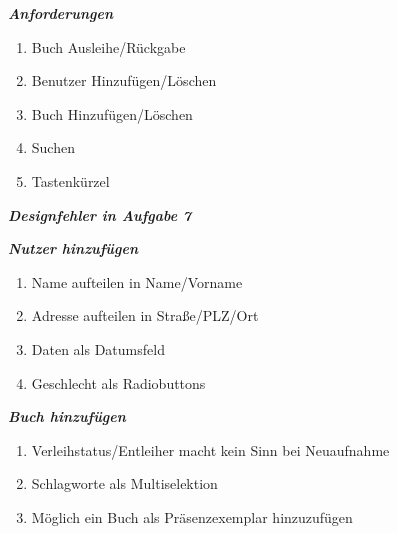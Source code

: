 \documentclass[a4paper,10pt]{article}
\begin{document}
\kopf
\renewcommand{\figurename}{Figure}


\textbf{\textit{Anforderungen}}
\begin{enumerate}
\item Buch Ausleihe/Rückgabe
\item Benutzer Hinzufügen/Löschen
\item Buch Hinzufügen/Löschen
\item Suchen	
\item Tastenkürzel
\end{enumerate}

\textbf{\textit{Designfehler in Aufgabe 7}} \newline

\textbf{\textit{Nutzer hinzufügen}}
\begin{enumerate}
\item Name aufteilen in Name/Vorname
\item Adresse aufteilen in Straße/PLZ/Ort
\item Daten als Datumsfeld
\item Geschlecht als Radiobuttons
\end{enumerate}

\textbf{\textit{Buch hinzufügen}} \newline
\begin{enumerate}
\item Verleihstatus/Entleiher macht kein Sinn bei Neuaufnahme
\item Schlagworte als Multiselektion
\item Möglich ein Buch als Präsenzexemplar hinzuzufügen
\end{enumerate}
\end{document}
